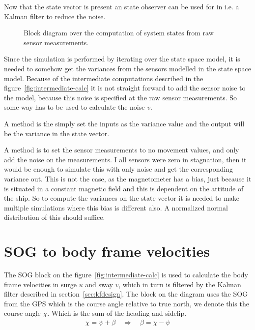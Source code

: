 Now that the state vector is present an state observer can be used for
in i.e. a Kalman filter to reduce the noise.

\begin{figure}
	\centering
	
	\caption{Block diagram over the computation of system states from
	raw sensor measurements.}
	\label{fig:intermediate-calc}
\end{figure}

Since the simulation is performed by iterating over the state space
model, it is needed to somehow get the variances from the sensors
modelled in the state space model. Because of the intermediate
computations described in the figure~\vref{fig:intermediate-calc} it
is not straight forward to add the sensor noise to the model, because
this noise is specified at the raw sensor measurements. So some way
has to be used to calculate the noise $v$.

A method is the simply set the inputs as the variance value and the
output will be the variance in the state vector. 

A method is to set the sensor measurements to no movement values, and
only add the noise on the measurements. I all sensors were zero in
stagnation, then it would be enough to simulate this with only noise and
get the corresponding variance out. This is not the case, as the
magnetometer has a bias, just because it is situated in a constant
magnetic field and this is dependent on the attitude of the ship. So
to compute the variances on the state vector it is needed to make
multiple simulations where this bias is different also. A normalized
normal distribution of this should suffice. 

\section{\acs{SOG} to body frame velocities}
The \acl{SOG} block on the figure~\vref{fig:intermediate-calc} is used to calculate the body frame velocities in surge $u$ and sway $v$, which in turn is filtered by the Kalman filter described in section~\vref{sec:kfdesign}. The block on the diagram uses the \ac{SOG} from the \ac{GPS} which is the course angle relative to true north, we denote this the course angle $\chi$. Which is the sum of the heading and sidelip.
\begin{align}
\chi = \psi + \beta \quad \Rightarrow  \quad \beta = \chi - \psi
\end{align}

